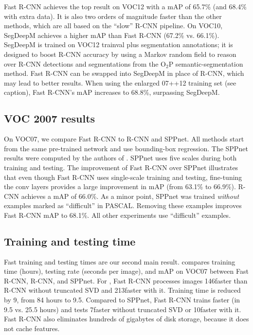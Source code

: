 Fast R-CNN achieves the top result on VOC12 with a mAP of 65.7\% (and 68.4\% with extra data).
It is also two orders of magnitude faster than the other methods, which are all based on the ``slow'' R-CNN pipeline.
On VOC10, SegDeepM \cite{Zhu2015segDeepM} achieves a higher mAP than Fast R-CNN (67.2\% vs. 66.1\%).
SegDeepM is trained on VOC12 trainval plus segmentation annotations; it is designed to boost R-CNN accuracy by using a Markov random field to reason over R-CNN detections and segmentations from the O$_2$P \cite{o2p} semantic-segmentation method.
Fast R-CNN can be swapped into SegDeepM in place of R-CNN, which may lead to better results.
When using the enlarged 07++12 training set (see  caption), Fast R-CNN's mAP increases to 68.8\%, surpassing SegDeepM.

\subsection{VOC 2007 results}
On VOC07, we compare Fast R-CNN to R-CNN and SPPnet.
All methods start from the same pre-trained \vggsixteen network and use bounding-box regression.
The \vggsixteen SPPnet results were computed by the authors of \cite{he2014spp}.
SPPnet uses five scales during both training and testing.
The improvement of Fast R-CNN over SPPnet illustrates that even though Fast R-CNN uses single-scale training and testing, fine-tuning the conv layers provides a large improvement in mAP (from 63.1\% to 66.9\%).
R-CNN achieves a mAP of 66.0\%.
As a minor point, SPPnet was trained \emph{without} examples marked as ``difficult'' in PASCAL.
Removing these examples improves Fast R-CNN mAP to 68.1\%.
All other experiments use ``difficult'' examples.

\subsection{Training and testing time}
Fast training and testing times are our second main result.
 compares training time (hours), testing rate (seconds per image), and mAP on VOC07 between Fast R-CNN, R-CNN, and SPPnet.
For \vggsixteen, Fast R-CNN processes images 146\X faster than R-CNN without truncated SVD and 213\X faster with it.
Training time is reduced by 9\X, from 84 hours to 9.5.
Compared to SPPnet, Fast R-CNN trains \X faster (in 9.5 vs. 25.5 hours) and tests 7\X faster without truncated SVD or 10\X faster with it.
Fast R-CNN also eliminates hundreds of gigabytes of disk storage, because it does not cache features.

